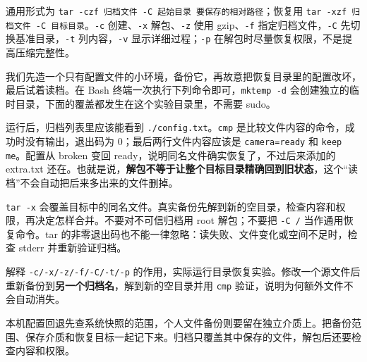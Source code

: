 通用形式为 \texttt{tar -czf 归档文件 -C 起始目录 要保存的相对路径}；恢复用 \texttt{tar -xzf 归档文件 -C 目标目录}。\texttt{-c} 创建、\texttt{-x} 解包、\texttt{-z} 使用 gzip、\texttt{-f} 指定归档文件，\texttt{-C} 先切换基准目录，\texttt{-t} 列内容，\texttt{-v} 显示详细过程；\texttt{-p} 在解包时尽量恢复权限，不是提高压缩完整性。
\begin{example}[备份、损坏、恢复与额外文件]
我们先造一个只有配置文件的小环境，备份它，再故意把恢复目录里的配置改坏，最后试着读档。在 Bash 终端一次执行下列命令即可，\texttt{mktemp -d} 会创建独立的临时目录，下面的覆盖都发生在这个实验目录里，不需要 sudo。


运行后，归档列表里应该能看到 \texttt{./config.txt}。\texttt{cmp} 是比较文件内容的命令，成功时没有输出，退出码为 0；最后两行文件内容应该是 \texttt{camera=ready} 和 \texttt{keep me}。配置从 broken 变回 ready，说明同名文件确实恢复了，不过后来添加的 extra.txt 还在。也就是说，\textbf{解包不等于让整个目标目录精确回到旧状态}，这个“读档”不会自动把后来多出来的文件删掉。
\end{example}
\begin{note}
\texttt{tar -x} 会覆盖目标中的同名文件。真实备份先解到新的空目录，检查内容和权限，再决定怎样合并。不要对不可信归档用 root 解包；不要把 \texttt{-C /} 当作通用恢复命令。tar 的非零退出码也不能一律忽略：读失败、文件变化或空间不足时，检查 stderr 并重新验证归档。
\end{note}
\begin{exercise}\label{ex:v1-tar-options}
解释 \texttt{-c/-x/-z/-f/-C/-t/-p} 的作用，实际运行目录恢复实验。修改一个源文件后重新备份到\textbf{另一个归档名}，解到新的空目录并用 \texttt{cmp} 验证，说明为何额外文件不会自动消失。
\end{exercise}
\begin{conclusion}
本机配置回退先查系统快照的范围，个人文件备份则要留在独立介质上。把备份范围、保存介质和恢复目标一起记下来。归档只覆盖其中保存的文件，解包后还要检查内容和权限。
\end{conclusion}
